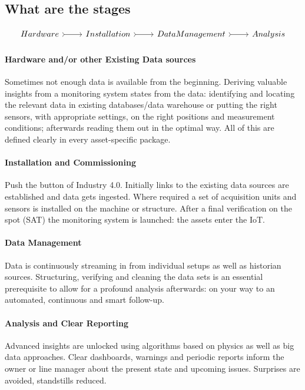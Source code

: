 \subsection{What are the stages}
\[\begin{tikzcd}
	{Hardware} & Installation & {Data \space Management} & Analysis
	\arrow[tail, from=1-1, to=1-2]
	\arrow[tail, from=1-2, to=1-3]
	\arrow[tail, from=1-3, to=1-4]
\end{tikzcd}\]
\paragraph{Hardware and/or other Existing Data sources}
Sometimes not enough data is available from the beginning. Deriving valuable insights from a monitoring system states from the data:
identifying and locating the relevant data in existing databases/data warehouse or putting the right sensors,
with appropriate settings, on the right positions and measurement conditions;
afterwards reading them out in the optimal way. All of this are defined clearly in every asset-specific package.

\paragraph{Installation and Commissioning}
Push the button of Industry 4.0. Initially links to the existing data sources are established and data gets ingested. 
Where required a set of acquisition units and sensors is installed on the machine or structure.
After a final verification on the spot (SAT) the monitoring system is launched: the assets enter the IoT.

\paragraph{Data Management}
Data is continuously streaming in from individual setups as well as historian sources. 
Structuring, verifying and cleaning the data sets is an essential prerequisite to allow for a profound analysis afterwards: on your way to an automated, continuous and smart follow-up.

\paragraph{Analysis and Clear Reporting}
Advanced insights are unlocked using algorithms based on physics as well as big data approaches. 
Clear dashboards, warnings and periodic reports inform the owner or line manager about the present state and upcoming issues. Surprises are avoided, standstills reduced.

